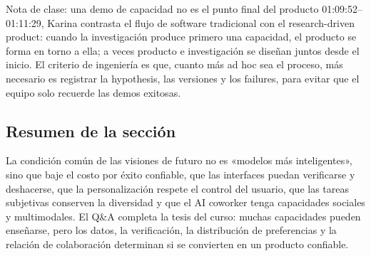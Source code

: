 \begin{importantbox}{Nota de clase: una demo de capacidad no es el punto final del producto}
01:09:52--01:11:29, Karina contrasta el flujo de software tradicional con el research-driven product: cuando la investigación produce primero una capacidad, el producto se forma en torno a ella; a veces producto e investigación se diseñan juntos desde el inicio. El criterio de ingeniería es que, cuanto más ad hoc sea el proceso, más necesario es registrar la hypothesis, las versiones y los failures, para evitar que el equipo solo recuerde las demos exitosas.
\end{importantbox}

\subsection{Resumen de la sección}

La condición común de las visiones de futuro no es «modelos más inteligentes», sino que baje el costo por éxito confiable, que las interfaces puedan verificarse y deshacerse, que la personalización respete el control del usuario, que las tareas subjetivas conserven la diversidad y que el AI coworker tenga capacidades sociales y multimodales. El Q\&A completa la tesis del curso: muchas capacidades pueden enseñarse, pero los datos, la verificación, la distribución de preferencias y la relación de colaboración determinan si se convierten en un producto confiable.
